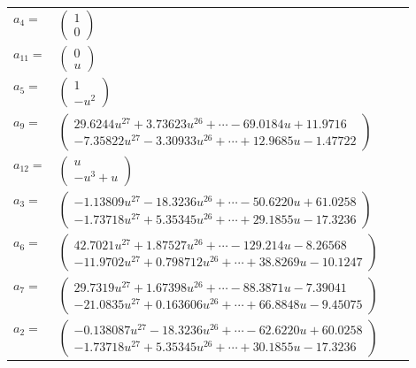 \documentclass[1p]{elsarticle_modified}
\theoremstyle{definition}
\begin{document}
\begin{tabular}{m{7pt} m{180pt} m{7pt} m{180pt} }
\flushright $a_{4}=$&$\begin{pmatrix}1\\0\end{pmatrix}$ \\
\flushright $a_{11}=$&$\begin{pmatrix}0\\u\end{pmatrix}$ \\
\flushright $a_{5}=$&$\begin{pmatrix}1\\- u^2\end{pmatrix}$ \\
\flushright $a_{9}=$&$\begin{pmatrix}29.6244 u^{27}+3.73623 u^{26}+\cdots-69.0184 u+11.9716\\-7.35822 u^{27}-3.30933 u^{26}+\cdots+12.9685 u-1.47722\end{pmatrix}$ \\
\flushright $a_{12}=$&$\begin{pmatrix}u\\- u^3+u\end{pmatrix}$ \\
\flushright $a_{3}=$&$\begin{pmatrix}-1.13809 u^{27}-18.3236 u^{26}+\cdots-50.6220 u+61.0258\\-1.73718 u^{27}+5.35345 u^{26}+\cdots+29.1855 u-17.3236\end{pmatrix}$ \\
\flushright $a_{6}=$&$\begin{pmatrix}42.7021 u^{27}+1.87527 u^{26}+\cdots-129.214 u-8.26568\\-11.9702 u^{27}+0.798712 u^{26}+\cdots+38.8269 u-10.1247\end{pmatrix}$ \\
\flushright $a_{7}=$&$\begin{pmatrix}29.7319 u^{27}+1.67398 u^{26}+\cdots-88.3871 u-7.39041\\-21.0835 u^{27}+0.163606 u^{26}+\cdots+66.8848 u-9.45075\end{pmatrix}$ \\
\flushright $a_{2}=$&$\begin{pmatrix}-0.138087 u^{27}-18.3236 u^{26}+\cdots-62.6220 u+60.0258\\-1.73718 u^{27}+5.35345 u^{26}+\cdots+30.1855 u-17.3236\end{pmatrix}$ \\

\end{tabular}
\end{document}
